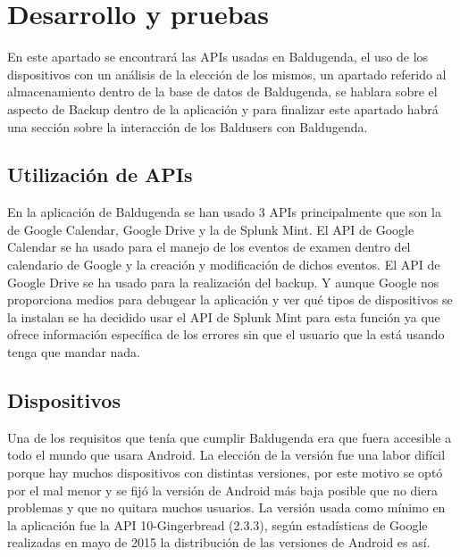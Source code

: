\section{Desarrollo y pruebas}
\label{secc:desarrollo y pruebas}
En este apartado se encontrará las APIs usadas en Baldugenda, el uso de los dispositivos con un análisis de la elección de los mismos, un apartado referido al almacenamiento dentro de la base de datos de Baldugenda, se hablara sobre el aspecto de Backup dentro de la aplicación y para finalizar este apartado habrá una sección sobre la interacción de los Baldusers con Baldugenda.
\subsection{Utilización de APIs}
\label{subsecc:Utilización de APIs}

En la aplicación de Baldugenda se han usado 3 APIs principalmente que son la de Google Calendar, Google Drive y la de Splunk Mint.
El API de Google Calendar se ha usado para el manejo de los eventos de examen dentro del calendario de Google y la creación y modificación de dichos eventos.
El API de Google Drive se ha usado para la realización del backup.
Y aunque Google nos proporciona medios para debugear la aplicación y ver qué tipos de dispositivos se la instalan se ha decidido usar el API de Splunk Mint para esta función ya que ofrece información específica de los errores sin que el usuario que la está usando tenga que mandar nada.

\subsection{Dispositivos}
\label{subsecc:Dispositivos}

Una de los requisitos que tenía que cumplir Baldugenda era que fuera accesible a todo el mundo que usara Android. La elección de la versión fue una labor difícil porque hay muchos dispositivos con distintas versiones, por este motivo se optó por el mal menor y se fijó la versión de Android más baja posible que no diera problemas y que no quitara muchos usuarios.
La versión usada como mínimo en la aplicación fue la API 10-Gingerbread (2.3.3), según estadísticas de Google realizadas en mayo de 2015 la distribución de las versiones de Android es así.

